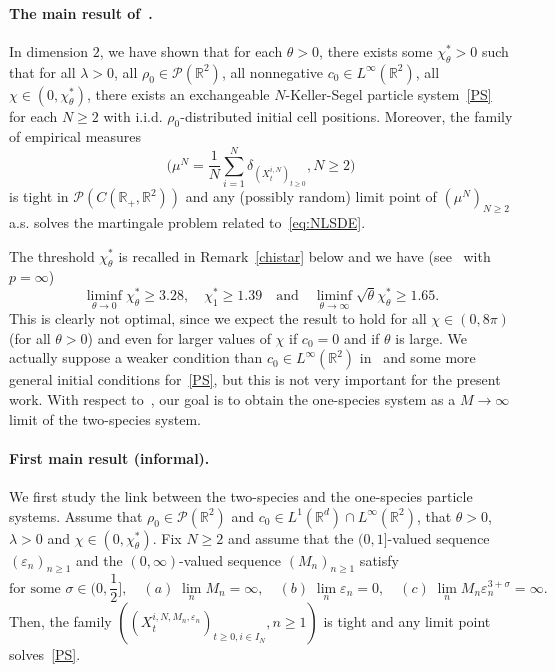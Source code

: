 \documentclass[11pt]{article}
\newcommand{\R}{\mathbb{R}}
\newcommand{\1}{\mathbbm{1}}
\newcommand{\Pp}{\mathcal P}
\newcommand{\e}{\varepsilon}
\newcommand{\vip}{\vskip5pt}
\begin{document}
\paragraph{The main result of~\cite{FT1}.}
In dimension $2$, we have shown that for each $\theta>0$,  there exists some $\chi_{\theta}^*>0$ such that for all $\lambda>0$, all $\rho_0\in \Pp(\R^2)$, all nonnegative $c_0\in L^\infty(\R^2)$, all $\chi \in (0,\chi^*_\theta)$, there exists an exchangeable $N$-Keller-Segel particle system~\eqref{PS} for each $N\geq 2$ with i.i.d. $\rho_0$-distributed initial cell positions. Moreover, the family of empirical measures 
$$
\Big(\mu^N=\frac1N\sum_{i=1}^N \delta_{(X^{i,N}_t)_{t\geq 0}}, N \geq 2\Big)
$$  
is tight in $\Pp(C(\R_+,\R^2))$ and any (possibly random) limit point
of $(\mu^N)_{N\geq 2}$ a.s. solves the martingale problem related to~\eqref{eq:NLSDE}.

\vip
The threshold $\chi^*_\theta$ is recalled in Remark~\ref{chistar} 
below and we have (see~\cite[Remark~15]{FT1} with $p=\infty$) 
\begin{equation}\label{estth}
\liminf_{\theta\to 0} \chi_{\theta}^* \geq 3.28, \quad \chi_{1}^*\geq 1.39 \quad
\text{and} \quad \liminf_{\theta\to \infty} \sqrt\theta\chi_{\theta}^* \geq 1.65. 
\end{equation}
This is clearly not optimal, since we expect the result to hold for all $\chi\in (0,8\pi)$ (for all $\theta>0$) and even for larger values of $\chi$ if $c_0=0$ and if $\theta$ is large. 
\vip
We actually suppose a weaker condition than $c_0 \in L^\infty(\R^2)$ in~\cite{FT1} and some more general initial conditions for~\eqref{PS}, but this is not very important for the present work.
\vip
With respect to~\cite{FT1}, our goal is to obtain the one-species system as a $M\to \infty$ limit of the two-species system.


\paragraph{First main result (informal).}
We first study the link between the two-species and the one-species
particle systems. Assume that $\rho_0 \in \Pp(\R^2)$ and $c_0 \in L^1(\R^d)\cap L^\infty(\R^2)$,
that $\theta>0$, $\lambda>0$ and $\chi \in (0,\chi^*_\theta)$. Fix $N\geq 2$ and assume that
the $(0,1]$-valued sequence $(\e_n)_{n\geq 1}$ and the $(0,\infty)$-valued sequence $(M_n)_{n\geq 1}$ satisfy
\begin{equation}\label{ccc1}
\text{for some $\sigma \in \Big(0,\frac12\Big]$},\quad (a) \; \lim_n M_n=\infty, \quad (b)\; \lim_n\e_n=0,\quad (c)\; \lim_n M_n\e_n^{3+\sigma}=\infty.
\end{equation}
Then, the family 
$((X^{i,N,M_n,\e_n}_t)_{t\geq 0, i \in I_N}, n\geq 1)$ is tight and any limit point solves~\eqref{PS}.
\end{document}
